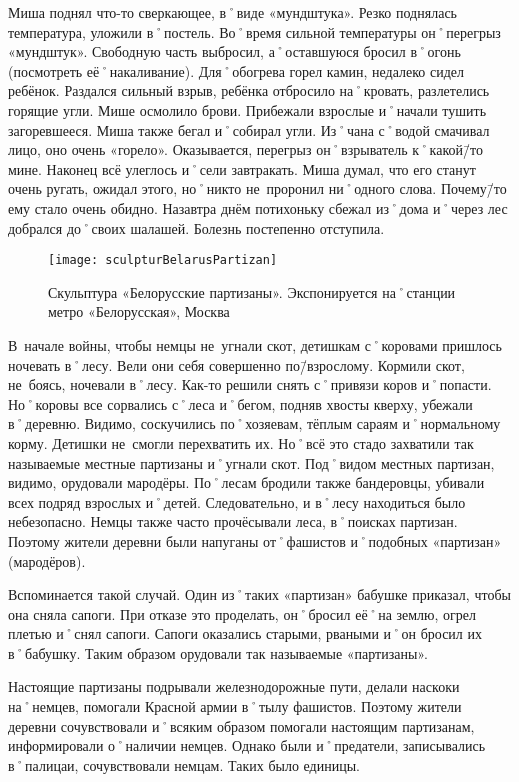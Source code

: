 Миша поднял что-то сверкающее, в˚виде «мундштука». Резко поднялась температура, уложили в˚постель. Во˚время сильной температуры он˚перегрыз «мундштук». Свободную часть выбросил, а˚оставшуюся бросил в˚огонь (посмотреть её˚накаливание). Для˚обогрева горел камин, недалеко сидел ребёнок. Раздался сильный взрыв, ребёнка отбросило на˚кровать, разлетелись горящие угли. Мише осмолило брови. Прибежали взрослые и˚начали тушить загоревшееся. Миша также бегал и˚собирал угли. Из˚чана с˚водой смачивал лицо, оно очень «горело». Оказывается, перегрыз он˚взрыватель к˚какой\=/то мине. Наконец всё улеглось и˚сели завтракать. Миша думал, что его станут очень ругать, ожидал этого, но˚никто не~проронил ни˚одного слова. Почему\=/то ему стало очень обидно. Назавтра днём потихоньку сбежал из˚дома и˚через лес добрался до˚своих шалашей. Болезнь постепенно отступила. 

\begin{wrapfigure}{O}{.4\textwidth}
\centering
\texttt{[image: sculpturBelarusPartizan]}
\caption{Скульптура «Белорусские партизаны». Экспонируется на˚станции метро «Белорусская», Москва}
\label{fig:sculpturBelarusPartizan}
\end{wrapfigure}

В~начале войны, чтобы немцы не~угнали скот, детишкам с˚коровами пришлось ночевать в˚лесу. Вели они себя совершенно по\=/взрослому. Кормили скот, не~боясь, ночевали в˚лесу. Как-то решили снять с˚привязи коров и˚попасти. Но˚коровы все сорвались с˚леса и˚бегом, подняв хвосты кверху, убежали в˚деревню. Видимо, соскучились по˚хозяевам, тёплым сараям и˚нормальному корму. Детишки не~смогли перехватить их. Но˚всё это стадо захватили так называемые местные партизаны и˚угнали скот. Под˚видом местных партизан, видимо, орудовали мародёры. По˚лесам бродили также бандеровцы, убивали всех подряд взрослых и˚детей. Следовательно, и в˚лесу находиться было небезопасно. Немцы также часто прочёсывали леса, в˚поисках партизан. Поэтому жители деревни были напуганы от˚фашистов и˚подобных «партизан» (мародёров). 

Вспоминается такой случай. Один из˚таких «партизан» бабушке приказал, чтобы она сняла сапоги. При отказе это проделать, он˚бросил её˚на землю, огрел плетью и˚снял сапоги. Сапоги оказались старыми, рваными и˚он бросил их в˚бабушку. Таким образом орудовали так называемые «партизаны».

Настоящие партизаны подрывали железнодорожные пути, делали наскоки на˚немцев, помогали Красной армии в˚тылу фашистов. Поэтому жители деревни сочувствовали и˚всяким образом помогали настоящим партизанам, информировали о˚наличии немцев. Однако были и˚предатели, записывались в˚палицаи, сочувствовали немцам. Таких было единицы. 

